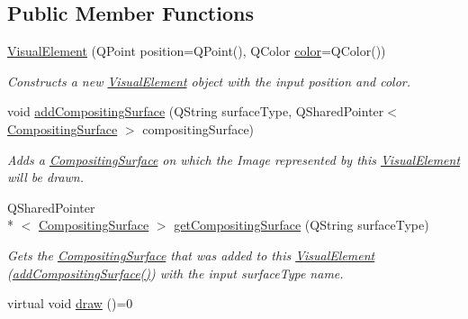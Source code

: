 \subsection*{Public Member Functions}
\begin{DoxyCompactItemize}
\item 
\hyperlink{struct_picto_1_1_visual_element_a73fe99d89a8af18c80c94dd43fb37b43}{Visual\-Element} (Q\-Point position=Q\-Point(), Q\-Color \hyperlink{struct_picto_1_1_visual_element_a45c3042c969717eb2ab60373369c7de7}{color}=Q\-Color())
\begin{DoxyCompactList}\small\item\em Constructs a new \hyperlink{struct_picto_1_1_visual_element}{Visual\-Element} object with the input position and color. \end{DoxyCompactList}\item 
void \hyperlink{struct_picto_1_1_visual_element_a3be26e20cb27604c8d978cf334898dd9}{add\-Compositing\-Surface} (Q\-String surface\-Type, Q\-Shared\-Pointer$<$ \hyperlink{struct_picto_1_1_compositing_surface}{Compositing\-Surface} $>$ compositing\-Surface)
\begin{DoxyCompactList}\small\item\em Adds a \hyperlink{struct_picto_1_1_compositing_surface}{Compositing\-Surface} on which the Image represented by this \hyperlink{struct_picto_1_1_visual_element}{Visual\-Element} will be drawn. \end{DoxyCompactList}\item 
Q\-Shared\-Pointer\\*
$<$ \hyperlink{struct_picto_1_1_compositing_surface}{Compositing\-Surface} $>$ \hyperlink{struct_picto_1_1_visual_element_a34c99101e6d6eadddab1950ea8642dc3}{get\-Compositing\-Surface} (Q\-String surface\-Type)
\begin{DoxyCompactList}\small\item\em Gets the \hyperlink{struct_picto_1_1_compositing_surface}{Compositing\-Surface} that was added to this \hyperlink{struct_picto_1_1_visual_element}{Visual\-Element} (\hyperlink{struct_picto_1_1_visual_element_a3be26e20cb27604c8d978cf334898dd9}{add\-Compositing\-Surface()}) with the input surface\-Type name. \end{DoxyCompactList}\item 
\hypertarget{struct_picto_1_1_visual_element_ad4a2003a51dadee2e5867abfafba68c1}{virtual void \hyperlink{struct_picto_1_1_visual_element_ad4a2003a51dadee2e5867abfafba68c1}{draw} ()=0}\label{struct_picto_1_1_visual_element_ad4a2003a51dadee2e5867abfafba68c1}


\end{DoxyCompactItemize}
